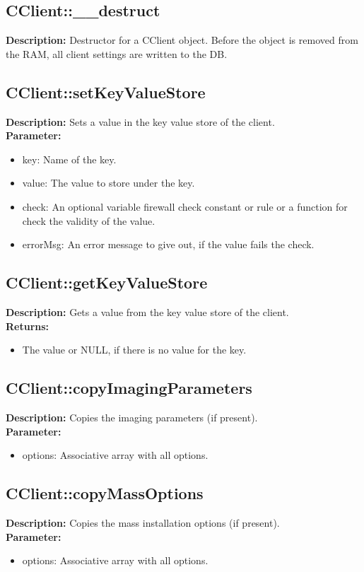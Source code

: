 \subsection{CClient::\_\_destruct}
\textbf{Description:} Destructor for a CClient object. Before the object is removed from the RAM, all client settings are written to the DB.\\

\subsection{CClient::setKeyValueStore}
\textbf{Description:} Sets a value in the key value store of the client.\\
\textbf{Parameter:}
\begin{itemize}
\item key: Name of the key.
\item value: The value to store under the key.
\item check: An optional variable firewall check constant or rule or a function for check the validity of the value.
\item errorMsg: An error message to give out, if the value fails the check.
\end{itemize}

\subsection{CClient::getKeyValueStore}
\textbf{Description:} Gets a value from the key value store of the client.\\
\textbf{Returns:}
\begin{itemize}
\item The value or NULL, if there is no value for the key.
\end{itemize}

\subsection{CClient::copyImagingParameters}
\textbf{Description:} Copies the imaging parameters (if present).\\
\textbf{Parameter:}
\begin{itemize}
\item options: Associative array with all options.
\end{itemize}

\subsection{CClient::copyMassOptions}
\textbf{Description:} Copies the mass installation options (if present).\\
\textbf{Parameter:}
\begin{itemize}
\item options: Associative array with all options.
\end{itemize}

